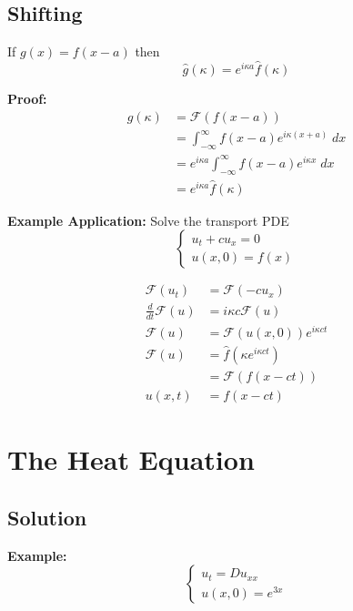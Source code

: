 \documentclass[10pt]{article}
\renewcommand{\hat}[1]{\widehat{#1}}
\newcommand{\F}{\mathcal{F}}
\begin{document}
\subsection{Shifting}
If $g(x) = f(x - a)$ then 
\[\hat{g}(\kappa) = e^{i\kappa a}\hat{f}(\kappa)\]

\textbf{Proof:} 
\begin{align*}
    \hat{g}(\kappa) &= \F(f(x-a))\\
    &= \int_{-\infty}^{\infty} f(x-a)e^{i\kappa(x + a)}\; dx\\
    &= e^{i\kappa a}\int_{-\infty}^{\infty} f(x-a)e^{i\kappa x}\; dx\\
    &= e^{i\kappa a} \hat{f}(\kappa)
\end{align*}

\textbf{Example Application:} Solve the transport PDE 
\[\begin{cases}
    u_t + cu_x =0\\
    u(x, 0) = f(x)
\end{cases}\]

\begin{align*}
    \F(u_t) &= \F(-cu_x)\\
    \frac{d}{dt}\F(u) &= i\kappa c \F(u)\\
    \F(u) &= \F(u(x, 0))e^{i\kappa ct}\\
    \F(u) &= \hat{f}(\kappa e^{i\kappa ct})\\
        &= \F(f(x -ct))\\
    u(x, t) &= f(x -ct)
\end{align*}

\section{The Heat Equation}
\subsection{Solution}
\textbf{Example:}
\[\begin{cases}
    u_t = Du_{xx}\\
    u(x, 0) = e^{3x}
\end{cases}\]
\end{document}
